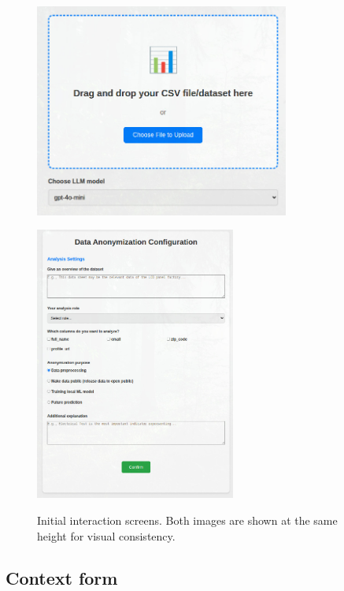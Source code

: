 \documentclass{article}
\begin{document}
\begin{figure}[h]
    \centering
    \begin{minipage}[c]{0.48\linewidth}
        \centering
        \includegraphics[height=7cm]{images/upload_ui.jpg}
        \label{fig:ui-upload}
    \end{minipage}\hfill
    \begin{minipage}[c]{0.48\linewidth}
        \centering
        \includegraphics[height=9cm]{images/form_ui.jpg}
        \label{fig:ui-context}
    \end{minipage}
    \caption{Initial interaction screens.  Both images are shown at the same height for visual consistency.}
    \label{fig:ui-initial-screens}
\end{figure}


\subsection{Context form}
\end{document}
